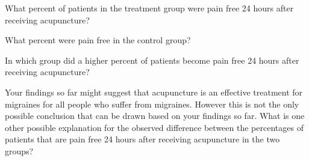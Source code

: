 {	\begin{parts}
		\item What percent of patients in the treatment group were pain free 24 hours 
		after receiving acupuncture? 
		\item What percent were pain free in the control group?
		\item In which group did a higher percent of patients become pain free 24 hours 
		after receiving acupuncture?
		\item Your findings so far might suggest that acupuncture is an effective treatment 
		for migraines for all people who suffer from migraines. However this is not the 
		only possible conclusion that can be drawn based on your findings so far. What is 
		one other possible explanation for the observed difference between the percentages 
		of patients that are pain free 24 hours after receiving acupuncture in the two groups?
	\end{parts}
}{}


